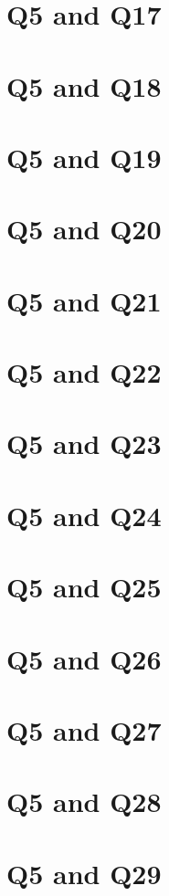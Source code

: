\documentclass{report}
\begin{document}
\section{Q5 and Q17}\clearpage
\section{Q5 and Q18}\clearpage
\section{Q5 and Q19}\clearpage
\section{Q5 and Q20}\clearpage
\section{Q5 and Q21}\clearpage
\section{Q5 and Q22}\clearpage
\section{Q5 and Q23}\clearpage
\section{Q5 and Q24}\clearpage
\section{Q5 and Q25}\clearpage
\section{Q5 and Q26}\clearpage
\section{Q5 and Q27}\clearpage
\section{Q5 and Q28}\clearpage
\section{Q5 and Q29}\clearpage
\end{document}
